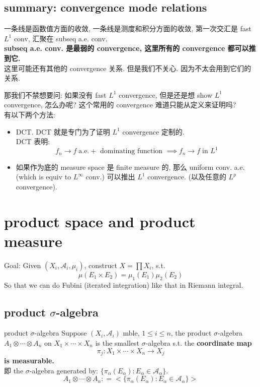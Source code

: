 \documentclass[lang=cn,11pt]{elegantbook}
\begin{document}
\section{summary: convergence mode relations}
一条线是函数值方面的收敛, 一条线是测度和积分方面的收敛,  第一次交汇是 fast $L^1$ conv, 汇聚在 subseq a.e. conv. \\
\textbf{subseq a.e. conv. 是最弱的 convergence, 这里所有的 convergence 都可以推到它.}\\
这里可能还有其他的 convergence 关系. 但是我们不关心. 因为不太会用到它们的关系.
\begin{remark}
    那我们不禁想要问: 如果没有 fast $L^1$ convergence, 但是还是想 show $L^1$ convergence, 怎么办呢? 这个常用的 convergence 难道只能从定义来证明吗?\\
有以下两个方法:
\begin{itemize}
    \item DCT. DCT 就是专门为了证明 $L^1$ convergence 定制的.\\
    DCT 表明: \[
  f_n\to f  \; \text{a.e.} + \text{ dominating function } \implies f_n \to f \; \text{in } L^1
    \]
    \item 如果作为底的 measure space 是 finite measure 的, 那么 uniform conv. a.e. (which is equiv to $L^\infty$ conv.) 可以推出 $L^1$ convergence. (以及任意的 $L^p$ convergence).

\end{itemize}
\end{remark}




\chapter{product space and product measure}

Goal: Given $(X_i, \mathcal{A}_i, \mu_i)$, construct $X = \prod X_i $, s.t. 
\[
\mu(E_1 \times E_2 )  = \mu_1(E_1) \mu_2(E_2)
\]
So that we can do Fubini (iterated integration) like that in Riemann integral.


\section{product $\sigma$-algebra}
\begin{definition}{product $\sigma$-algebra}
Suppose $(X_i, \mathcal{A}_i)$ mble, $1 \leq i\leq n$, the product $\sigma$-algebra $A_1 \otimes \cdots \otimes A_n$ on $X_1 \times \cdots \times X_n$ is the smallest $\sigma$-algebra s.t. the\textbf{ coordinate map }$$ \pi_j: X_1 \times \cdots \times X_n \rightarrow X_j$$\textbf{is measurable.}\\
即 the $\sigma$-algebra generated by: \(
\{  \pi_\alpha (E_\alpha) : E_\alpha  \in \mathcal{A_\alpha} \}
\). \[
A_1 \otimes \cdots \otimes A_n : = <\{  \pi_\alpha (E_\alpha) : E_\alpha  \in \mathcal{A_\alpha} \}>
\]

\end{definition}
\end{document}
